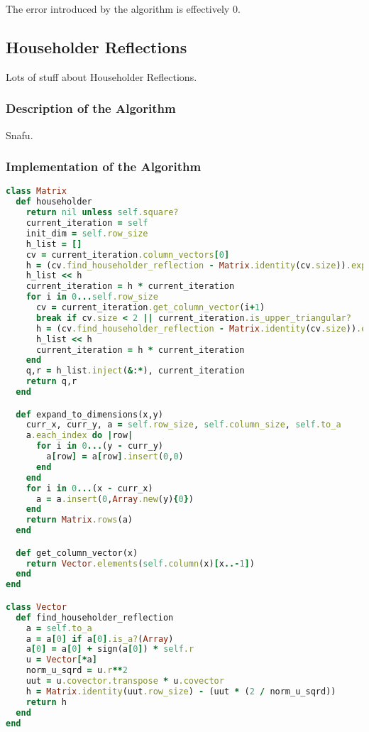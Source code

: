 \documentclass[letterpaper,11pt]{article}
\begin{document}
The error introduced by the algorithm is effectively $0$.


\subsection{Householder Reflections}

Lots of stuff about Householder Reflections.

\subsubsection{Description of the Algorithm}

Snafu.

\subsubsection{Implementation of the Algorithm}

\lstset{caption=QR Decomposition via Householder Reflections}
\begin{lstlisting}[language=ruby]
class Matrix
  def householder
    return nil unless self.square?
    current_iteration = self
    init_dim = self.row_size
    h_list = []
    cv = current_iteration.column_vectors[0]
    h = (cv.find_householder_reflection - Matrix.identity(cv.size)).expand_to_dimensions(init_dim,init_dim) + Matrix.identity(init_dim)
    h_list << h
    current_iteration = h * current_iteration
    for i in 0...self.row_size
      cv = current_iteration.get_column_vector(i+1)
      break if cv.size < 2 || current_iteration.is_upper_triangular?
      h = (cv.find_householder_reflection - Matrix.identity(cv.size)).expand_to_dimensions(init_dim,init_dim) + Matrix.identity(init_dim)
      h_list << h
      current_iteration = h * current_iteration
    end
    q,r = h_list.inject(&:*), current_iteration
    return q,r
  end

  def expand_to_dimensions(x,y)
    curr_x, curr_y, a = self.row_size, self.column_size, self.to_a
    a.each_index do |row|
      for i in 0...(y - curr_y)
        a[row] = a[row].insert(0,0)
      end
    end
    for i in 0...(x - curr_x)
      a = a.insert(0,Array.new(y){0})
    end
    return Matrix.rows(a)
  end

  def get_column_vector(x)
    return Vector.elements(self.column(x)[x..-1])
  end
end

class Vector
  def find_householder_reflection
    a = self.to_a
    a = a[0] if a[0].is_a?(Array)
    a[0] = a[0] + sign(a[0]) * self.r
    u = Vector[*a]
    norm_u_sqrd = u.r**2
    uut = u.covector.transpose * u.covector
    h = Matrix.identity(uut.row_size) - (uut * (2 / norm_u_sqrd))
    return h
  end
end
\end{lstlisting}
\end{document}
